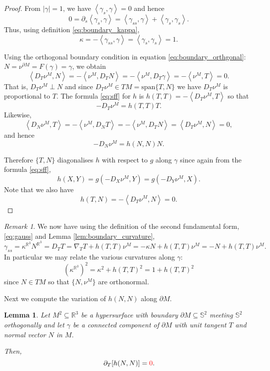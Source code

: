 \documentclass[10pt]{amsart}
\newcommand{\IP}[2]{\left< #1 , #2 \right>}
\newcommand{\R}{\ensuremath{\mathbb{R}}}
\renewcommand{\S}{\ensuremath{\mathbb{S}}}
\newtheorem{lem}[thm]{Lemma}
\theoremstyle{remark}
\newtheorem*{rmk}{Remark}
\begin{document}
\begin{proof}
From \(|\gamma| = 1\), we have \(\IP{\gamma_s}{\gamma} = 0\) and hence
\[
0 = \partial_s \IP{\gamma_s}{\gamma} = \IP{\gamma_{ss}}{\gamma} + \IP{\gamma_s}{\gamma_s}.
\]
Thus, using definition \eqref{eq:boundary_kappa},
\[
\kappa = -\IP{\gamma_{ss}}{\gamma} = \IP{\gamma_s}{\gamma_s} = 1.
\]

Using the orthogonal boundary condition in equation \eqref{eq:boundary_orthgonal}: \(N = \nu^{\partial M} = F(\gamma) = \gamma\), we obtain
\[
\IP{D_T \nu^M}{N} = -\IP{\nu^M}{D_T N} = -\IP{\nu^M}{D_T \gamma} = -\IP{\nu^M}{T} = 0.
\]
That is, \(D_T \nu^M \perp N\) and since \(D_T \nu^M \in TM = \text{span} \{T, N\}\) we have \(D_T \nu^M\) is proportional to \(T\). The formula \eqref{eq:sff} for \(h\) is \(h(T, T) = -\IP{D_T \nu^M}{T}\) so that
\[
-D_T \nu^M = h(T, T) T.
\]
Likewise,
\[
\IP{D_{N} \nu^M}{T} = -\IP{\nu^M}{D_{N} T} = -\IP{\nu^M}{D_T N} = \IP{D_T \nu^M}{N} = 0,
\]
and hence
\[
-D_N \nu^M = h(N, N) N.
\]

Therefore \(\{T, N\}\) diagonalises \(h\) with respect to \(g\) along \(\gamma\) since again from the formula \eqref{eq:sff},
\[
h(X, Y) = g(-D_X \nu^M, Y) = g(-D_Y \nu^M, X).
\]
Note that we also have
\[
h(T, N) = - \IP{D_T \nu^M}{N} = 0.
\]
\end{proof}

\begin{rmk}
We now have using the definition of the second fundamental form, \eqref{eq:gauss} and Lemma \ref{lem:boundary_curvature},
\[
\gamma_{ss} = \kappa^{\R^3} N^{\R^3} = D_T T = \nabla_T T + h(T, T)\nu^M = -\kappa N + h(T, T) \nu^M = -N + h(T, T) \nu^M.
\]
In particular we may relate the various curvatures along \(\gamma\):
\begin{equation}
\label{eq:boundary_curvature_relations}
(\kappa^{\R^3})^2 = \kappa^2 + h(T, T)^2 = 1 + h(T, T)^2
\end{equation}
since \(N \in TM\) so that \(\{N, \nu^M\}\) are orthonormal.
\end{rmk}

Next we compute the variation of \(h(N, N)\) along \(\partial M\).

\begin{lem}
\label{lem:hNN_variation}
Let \(M^2 \subseteq \R^3\) be a hypersurface with boundary \(\partial M \subseteq \S^2\) meeting \(\S^2\) orthogonally and let \(\gamma\) be a connected component of \(\partial M\) with unit tangent \(T\) and normal vector \(N\) in \(M\).

Then,
\[
\partial_T [h(N, N)] = {\color{red} 0}.
\]
\end{lem}
\end{document}
